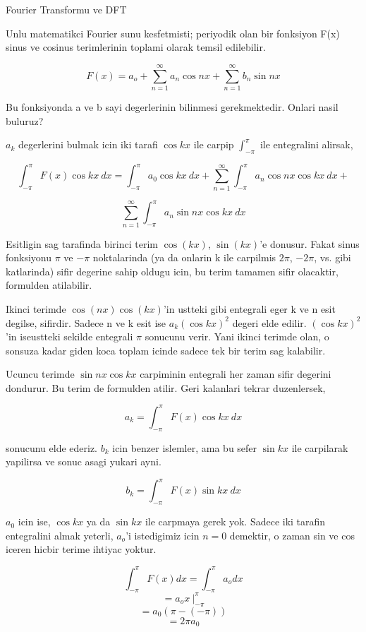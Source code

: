 \documentclass[12pt,fleqn]{article}\usepackage{../common}
\begin{document}
Fourier Transformu ve DFT

Unlu matematikci Fourier sunu kesfetmisti; periyodik olan bir fonksiyon F(x)
sinus ve cosinus terimlerinin toplami olarak temsil edilebilir.

\[ F(x) = a_o + \sum_{n=1}^{\infty}a_n \cos nx + \sum_{n=1}^{\infty}b_n \sin nx  \]

Bu fonksiyonda a ve b sayi degerlerinin bilinmesi gerekmektedir. Onlari nasil
buluruz? 

$a_k$ degerlerini bulmak icin iki tarafi $\cos kx$ ile carpip
$\int_{-\pi}^{\pi}$ ile entegralini alirsak,

\[ \int_{-\pi}^{\pi} F(x)\cos kx \ dx = \int_{-\pi}^{\pi} a_0 \cos
kx \ dx +  \sum_{n=1}^{\infty}\int_{-\pi}^{\pi} a_n \cos nx \cos kx \ dx +   \]

\[ \sum_{n=1}^{\infty}\int_{-\pi}^{\pi} a_n \sin nx \cos kx \ dx   \]

Esitligin sag tarafinda birinci terim $\cos(kx)$, $\sin(kx)$'e donusur. Fakat sinus
fonksiyonu $\pi$ ve $-\pi$ noktalarinda (ya da onlarin k ile carpilmis $2\pi$,
$-2\pi$, vs. gibi katlarinda) sifir degerine sahip oldugu icin, bu terim tamamen
sifir olacaktir, formulden atilabilir.

Ikinci terimde $\cos(nx)\cos(kx)$'in ustteki gibi entegrali eger k ve n esit
degilse, sifirdir. Sadece n ve k esit ise $a_k(\cos kx)^2$ degeri elde edilir.
$(\cos kx)^2$'in iseustteki sekilde entegrali $\pi$ sonucunu verir. Yani ikinci
terimde olan, o sonsuza kadar giden koca toplam icinde sadece tek bir terim sag
kalabilir.

Ucuncu terimde $\sin nx \cos kx$ carpiminin entegrali her zaman
sifir degerini dondurur. Bu terim de formulden atilir. Geri kalanlari tekrar
duzenlersek, 

\[ a_k = \int_{-\pi}^{\pi} F(x)\cos kx \ dx \]

sonucunu elde ederiz. $b_k$ icin benzer islemler, ama bu sefer $\sin kx$ ile carpilarak yapilirsa ve
sonuc asagi yukari ayni.

\[ b_k = \int_{-\pi}^{\pi} F(x)\sin kx \ dx \]

$a_0$ icin ise, $\cos kx$ ya da $\sin kx$ ile carpmaya gerek yok. Sadece iki
tarafin entegralini almak yeterli, $a_o$'i istedigimiz icin $n=0$ demektir, o
zaman sin ve cos iceren hicbir terime ihtiyac yoktur.

\[  \int_{-\pi}^{\pi} F(x) dx =  \int_{-\pi}^{\pi} a_o dx \]
\[  =  a_o x \ \bigg|_{-\pi}^{\pi}  \]
\[  = a_0 (\pi -(-\pi))  \]
\[  = 2\pi a_0  \]
\end{document}
